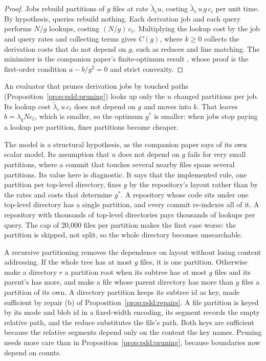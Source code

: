 \documentclass[11pt,letterpaper]{article}
\theoremstyle{definition}
\theoremstyle{remark}
\begin{document}
\begin{proof}
Jobs rebuild partitions of $g$ files at rate $\tilde\lambda_c u$, costing $\tilde\lambda_c\,u\,g\,c_i$ per unit time. By hypothesis, queries rebuild nothing. Each derivation job and each query performs $N/g$ lookups, costing $(N/g)\,c_\ell$. Multiplying the lookup cost by the job and query rates and collecting terms gives $C(g)$, where $k\ge 0$ collects the derivation costs that do not depend on $g$, such as reduces and line matching. The minimizer is the companion paper's finite-optimum result \cite[Eq.~19]{long2026inversion}, whose proof is the first-order condition $a-b/g^2=0$ and strict convexity.
\end{proof}

An evaluator that prunes derivation jobs by touched paths (Proposition~\ref{prop:pdd:pruning}) looks up only the $u$ changed partitions per job. Its lookup cost $\tilde\lambda_c\,u\,c_\ell$ does not depend on $g$ and moves into $k$. That leaves $b=\lambda_q N c_\ell$, which is smaller, so the optimum $g^*$ is smaller: when jobs stop paying a lookup per partition, finer partitions become cheaper.

The model is a structural hypothesis, as the companion paper says of its own scalar model. Its assumption that $u$ does not depend on $g$ fails for very small partitions, where a commit that touches several nearby files spans several partitions. Its value here is diagnostic. It says that the implemented rule, one partition per top-level directory, fixes $g$ by the repository's layout rather than by the rates and costs that determine $g^*$. A repository whose code sits under one top-level directory has a single partition, and every commit re-indexes all of it. A repository with thousands of top-level directories pays thousands of lookups per query. The cap of 20,000 files per partition makes the first case worse: the partition is skipped, not split, so the whole directory becomes unsearchable.

A recursive partitioning removes the dependence on layout without losing content addressing. If the whole tree has at most $g$ files, it is one partition. Otherwise make a directory $r$ a partition root when its subtree has at most $g$ files and its parent's has more, and make a file whose parent directory has more than $g$ files a partition of its own. A directory partition keeps its subtree id as key, made sufficient by repair (b) of Proposition~\ref{prop:pdd:repairs}. A file partition is keyed by its mode and blob id in a fixed-width encoding, its segment records the empty relative path, and the reduce substitutes the file's path. Both keys are sufficient because the relative segments depend only on the content the key names. Pruning needs more care than in Proposition~\ref{prop:pdd:pruning}, because boundaries now depend on counts.
\end{document}

